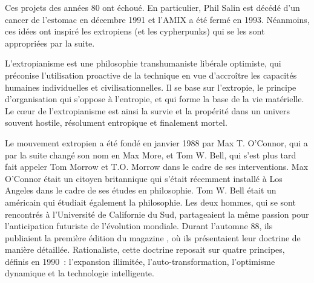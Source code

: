Ces projets des années 80 ont échoué. En particulier, Phil Salin est décédé d'un cancer de l'estomac en décembre 1991 et l'AMIX a été fermé en 1993. Néanmoins, ces idées ont inspiré les extropiens (et les cypherpunks) qui se les sont appropriées par la suite.


L'extropianisme est une philosophie transhumaniste libérale optimiste, qui préconise l'utilisation proactive de la technique en vue d'accroître les capacités humaines individuelles et civilisationnelles. Il se base sur l'extropie, le principe d'organisation qui s'oppose à l'entropie, et qui forme la base de la vie matérielle. Le cœur de l'extropianisme est ainsi la survie et la propérité dans un univers souvent hostile, résolument entropique et finalement mortel.

Le mouvement extropien a été fondé en janvier 1988 par Max T. O'Connor, qui a par la suite changé son nom en Max More, et Tom W. Bell, qui s'est plus tard fait appeler Tom Morrow et T.O. Morrow dans le cadre de ses interventions. Max O'Connor était un citoyen britannique qui s'était récemment installé à Los Angeles dans le cadre de ses études en philosophie. Tom W. Bell était un américain qui étudiait également la philosophie. Les deux hommes, qui se sont rencontrés à l'Université de Californie du Sud, partageaient la même passion pour l'anticipation futuriste de l'évolution mondiale. Durant l'automne 88, ils publiaient la première édition du magazine , où ils présentaient leur doctrine de manière détaillée. Rationaliste, cette doctrine reposait sur quatre principes, définis en 1990~: l'expansion illimitée, l'auto-transformation, l'optimisme dynamique et la technologie intelligente.

